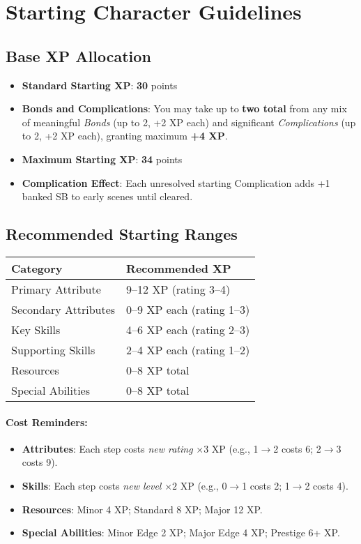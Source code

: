 \section{Starting Character Guidelines}
\label{ch:xp-paths:starting}

\subsection*{Base XP Allocation}
\begin{itemize}
\item \textbf{Standard Starting XP}: \textbf{30} points
\item \textbf{Bonds and Complications}: You may take up to \textbf{two total} from any mix of meaningful \emph{Bonds} (up to 2, +2 XP each) and significant \emph{Complications} (up to 2, +2 XP each), granting maximum \textbf{+4 XP}.
\item \textbf{Maximum Starting XP}: \textbf{34} points
\item \textbf{Complication Effect}: Each unresolved starting Complication adds +1 banked SB to early scenes until cleared.
\end{itemize}

\subsection*{Recommended Starting Ranges}
\begin{center}
\small
\begin{tabular}{ll}
\toprule
\textbf{Category} & \textbf{Recommended XP} \\
\midrule
Primary Attribute & 9--12 XP (rating 3--4) \\
Secondary Attributes & 0--9 XP each (rating 1--3) \\
Key Skills & 4--6 XP each (rating 2--3) \\
Supporting Skills & 2--4 XP each (rating 1--2) \\
Resources & 0--8 XP total \\
Special Abilities & 0--8 XP total \\
\bottomrule
\end{tabular}
\end{center}

\paragraph{Cost Reminders:}
\begin{itemize}
\item \textbf{Attributes}: Each step costs \emph{new rating} $\times 3$ XP (e.g., 1$\to$2 costs 6; 2$\to$3 costs 9).
\item \textbf{Skills}: Each step costs \emph{new level} $\times 2$ XP (e.g., 0$\to$1 costs 2; 1$\to$2 costs 4).
\item \textbf{Resources}: Minor 4 XP; Standard 8 XP; Major 12 XP.
\item \textbf{Special Abilities}: Minor Edge 2 XP; Major Edge 4 XP; Prestige 6+ XP.
\end{itemize}

